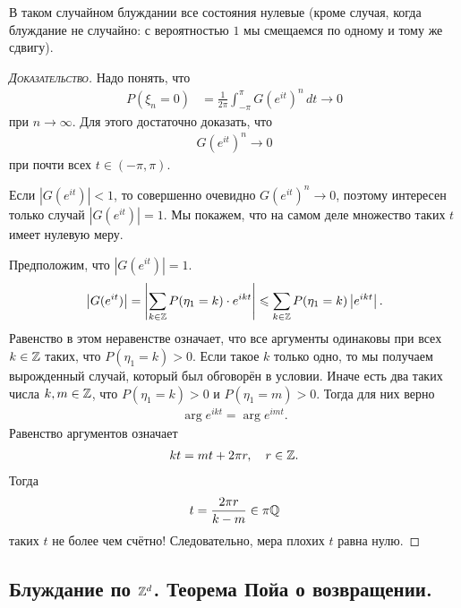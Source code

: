 \documentclass[../main.tex]{subfiles}
\begin{document}
 \begin{remrk}
  В таком случайном блуждании все состояния нулевые (кроме случая, когда блуждание не случайно: с вероятностью $ 1 $ мы смещаемся по одному и тому же сдвигу).
 \end{remrk}
 \begin{proof}[\normalfont\textsc{Доказательство}]
  Надо понять, что
  \begin{align*}
   P(\xi_n = 0) &= \frac{1}{2\pi} \int_{-\pi}^{\pi} G(e^{it})^{n}\,dt \to 0
  \end{align*} при $ n \to \infty $. Для этого достаточно доказать, что
  \begin{align*}
   G(e^{it})^{n} \to 0
  \end{align*} при почти всех $ t \in (-\pi, \pi) $.

  Если $ \left| G(e^{it}) \right| < 1 $, то совершенно очевидно $G(e^{it})^{n} \to 0$, поэтому интересен только случай $ \left| G(e^{it}) \right| = 1 $. Мы покажем, что на самом деле множество таких $ t $ имеет нулевую меру.

  Предположим, что $ \left| G(e^{it}) \right|=1 $.
  \begin{align*}
   \left| G(e^{it}) \right| = \left| \sum_{k \in \mathbb{Z}} P(\eta_1 =k) \cdot e^{ikt} \right| \leqslant \sum_{k \in \mathbb{Z}} P(\eta_1 = k) \left| e^{ikt} \right|.
  \end{align*} Равенство в этом неравенстве означает, что все аргументы одинаковы при всех $ k \in \mathbb{Z} $ таких, что $ P(\eta_1 = k) > 0 $. Если такое $ k $ только одно, то мы получаем вырожденный случай, который был обговорён в условии. Иначе есть два таких числа $ k,m\in\mathbb{Z} $, что $ P(\eta_1 = k) > 0 $ и $ P(\eta_1 = m) > 0 $. Тогда для них верно
  \begin{align*}
   \arg e^{ikt} = \arg e^{imt}.
  \end{align*} Равенство аргументов означает
  \begin{align*}
   kt = mt + 2\pi r, \quad r \in\mathbb{Z}.
  \end{align*} Тогда
  \begin{align*}
   t = \frac{2\pi r}{k - m} \in \pi \mathbb{Q}
  \end{align*} таких $ t $ не более чем счётно! Следовательно, мера плохих $ t $ равна нулю.
 \end{proof}

 \subsection{Блуждание по \texorpdfstring{$\mathbb{Z}^{d}$}{Zd}. Теорема Пойа о возвращении.}
\end{document}
